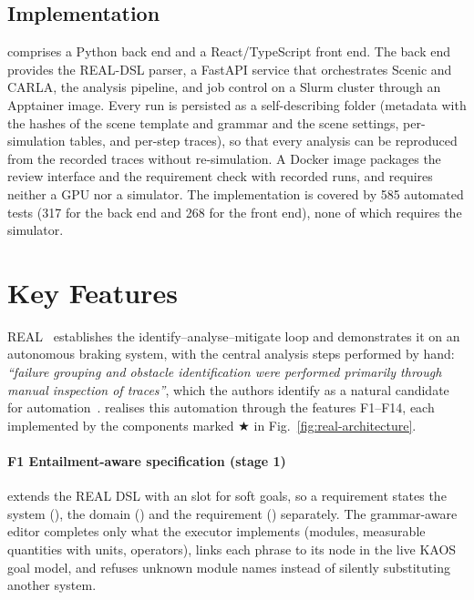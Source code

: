 \subsection{Implementation}
\label{sec:impl}
\tool{} comprises a Python back end and a React/TypeScript front end. The back
end provides the REAL-DSL parser, a FastAPI service that orchestrates Scenic and
CARLA, the analysis pipeline, and job control on a Slurm cluster through an
Apptainer image. Every run is persisted as a self-describing folder (metadata with
the hashes of the scene template and grammar and the scene settings,
per-simulation tables, and per-step traces), so that every analysis can be reproduced from the recorded traces
without re-simulation. A Docker image packages the review interface and the requirement check with
recorded runs, and requires neither a GPU nor a simulator. The implementation is
covered by 585 automated tests (317 for the back end and 268 for the
front end), none of which requires the simulator.

\section{Key Features}
\label{sec:features}

REAL~\cite{real2026} establishes the identify--analyse--mitigate loop and
demonstrates it on an autonomous braking system, with the central analysis
steps performed by hand: \emph{``failure grouping and obstacle identification
were performed primarily through manual inspection of traces''}, which the
authors identify as a natural candidate for automation~\cite[Sec.~V-D]{real2026}.
\tool{} realises this automation through the features F1--F14, each
implemented by the components marked $\bigstar$ in
Fig.~\ref{fig:real-architecture}.

\paragraph*{F1 Entailment-aware specification (stage 1)} \tool{} extends the
REAL DSL with an  slot for soft goals, so a requirement states
the system (), the domain () and the
requirement () separately. The grammar-aware editor completes
only what the executor implements (modules, measurable quantities with units,
operators), links each phrase to its node in the live KAOS goal model, and
refuses unknown module names instead of silently substituting another system.


